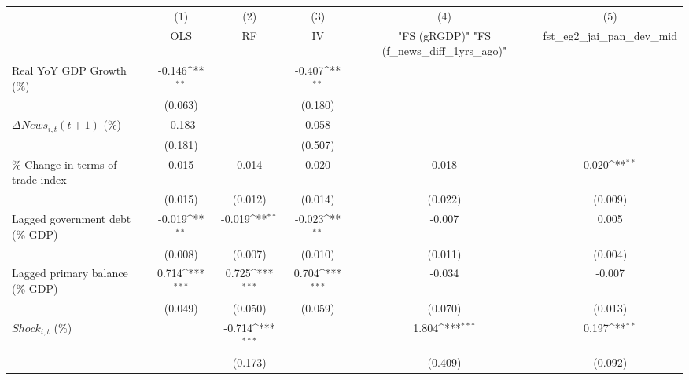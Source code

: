 {
\def\sym#1{\ifmmode^{#1}\else\(^{#1}\)\fi}
\begin{tabular}{l*{5}{c}}
\toprule
                    &\multicolumn{1}{c}{(1)}&\multicolumn{1}{c}{(2)}&\multicolumn{1}{c}{(3)}&\multicolumn{1}{c}{(4)}&\multicolumn{1}{c}{(5)}\\
                    &\multicolumn{1}{c}{OLS}&\multicolumn{1}{c}{RF}&\multicolumn{1}{c}{IV}&\multicolumn{1}{c}{ "FS (gRGDP)"  "FS (f_news_diff_1yrs_ago)" }&\multicolumn{1}{c}{fst_eg2_jai_pan_dev_mid}\\
\midrule
Real YoY GDP Growth (\%)&      -0.146\sym{**} &                     &      -0.407\sym{**} &                     &                     \\
                    &     (0.063)         &                     &     (0.180)         &                     &                     \\
\addlinespace
$ \Delta News_{i,t}(t+1)$ (\%)&      -0.183         &                     &       0.058         &                     &                     \\
                    &     (0.181)         &                     &     (0.507)         &                     &                     \\
\addlinespace
\% Change in terms-of-trade index&       0.015         &       0.014         &       0.020         &       0.018         &       0.020\sym{**} \\
                    &     (0.015)         &     (0.012)         &     (0.014)         &     (0.022)         &     (0.009)         \\
\addlinespace
Lagged government debt (\% GDP)&      -0.019\sym{**} &      -0.019\sym{**} &      -0.023\sym{**} &      -0.007         &       0.005         \\
                    &     (0.008)         &     (0.007)         &     (0.010)         &     (0.011)         &     (0.004)         \\
\addlinespace
Lagged primary balance (\% GDP)&       0.714\sym{***}&       0.725\sym{***}&       0.704\sym{***}&      -0.034         &      -0.007         \\
                    &     (0.049)         &     (0.050)         &     (0.059)         &     (0.070)         &     (0.013)         \\
\addlinespace
$ Shock_{i,t}$ (\%) &                     &      -0.714\sym{***}&                     &       1.804\sym{***}&       0.197\sym{**} \\
                    &                     &     (0.173)         &                     &     (0.409)         &     (0.092)         \\

\end{tabular}}
